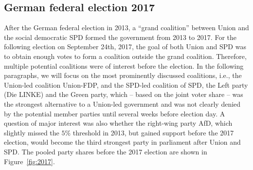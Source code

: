 \documentclass[smallextended]{svjour3}      %
\begin{document}



\subsection{German federal election 2017} \label{subsec:2017}
After the German federal election in 2013, a ``grand coalition'' between Union and the social
democratic SPD formed the government from 2013 to 2017.
For the following election on September 24th, 2017, the goal of both Union and SPD
was to obtain enough votes to form a coalition outside the grand
coalition. Therefore, multiple potential coalitions were of interest before the
election. In the following paragraphs, we will focus on the most prominently
discussed coalitions, i.e., the Union-led coalition Union-FDP, and the
SPD-led coalition of SPD, the Left party (Die LINKE) and the Green party, which
-- based on the joint voter share -- was the strongest alternative to a Union-led
government and was not clearly denied by the potential member parties until several weeks
before election day.
A question of major interest was also whether the right-wing party AfD, which
slightly missed the $5\%$ threshold in 2013, but gained support before the 2017 election,
would become the third strongest party in parliament after Union and SPD.
The pooled party shares before the 2017 election are shown in Figure~\ref{fig:2017}.
\end{document}
